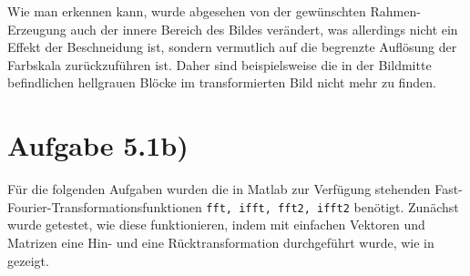 Wie man erkennen kann, wurde abgesehen von der gewünschten Rahmen-Erzeugung
auch der innere Bereich des Bildes verändert, was allerdings nicht ein Effekt der
Beschneidung ist, sondern vermutlich auf die begrenzte Auflösung der Farbskala 
zurückzuführen ist. Daher sind beispielsweise die in der Bildmitte befindlichen
hellgrauen Blöcke im transformierten Bild nicht mehr zu finden. 

\section*{Aufgabe 5.1b)}
Für die folgenden Aufgaben wurden die in Matlab zur Verfügung stehenden 
Fast-Fourier-Trans\-formationsfunktionen \texttt{fft, ifft, fft2, ifft2} benötigt.
Zunächst wurde getestet, wie diese funktionieren, indem mit einfachen Vektoren und
Matrizen eine Hin- und eine Rücktransformation durchgeführt wurde, wie in 
 gezeigt.


